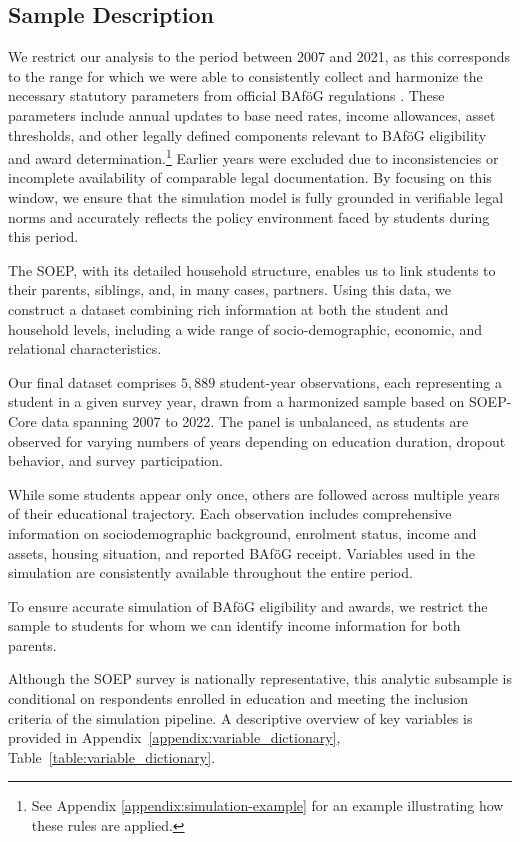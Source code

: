 \subsection{Sample Description}
We restrict our analysis to the period between 2007 and 2021, as this corresponds to the range for which we were able to consistently collect and harmonize the necessary statutory parameters from official BAföG regulations \citep{bafoeg_law}. These parameters include annual updates to base need rates, income allowances, asset thresholds, and other legally defined components relevant to BAföG eligibility and award determination.\footnote{
  See Appendix \ref{appendix:simulation-example} for an example illustrating how these rules are applied.
}
Earlier years were excluded due to inconsistencies or incomplete availability of comparable legal documentation. By focusing on this window, we ensure that the simulation model is fully grounded in verifiable legal norms and accurately reflects the policy environment faced by students during this period.

The SOEP, with its detailed household structure, enables us to link students to their parents, siblings, and, in many cases, partners. Using this data, we construct a dataset combining rich information at both the student and household levels, including a wide range of socio-demographic, economic, and relational characteristics.

Our final dataset comprises \(5{,}889\) student-year observations, each representing a student in a given survey year, drawn from a harmonized sample based on SOEP-Core data spanning 2007 to 2022. The panel is unbalanced, as students are observed for varying numbers of years depending on education duration, dropout behavior, and survey participation.

While some students appear only once, others are followed across multiple years of their educational trajectory. Each observation includes comprehensive information on sociodemographic background, enrolment status, income and assets, housing situation, and reported BAföG receipt. Variables used in the simulation are consistently available throughout the entire period.

To ensure accurate simulation of BAföG eligibility and awards, we restrict the sample to students for whom we can identify income information for both parents. 

Although the SOEP survey is nationally representative, this analytic subsample is conditional on respondents enrolled in education and meeting the inclusion criteria of the simulation pipeline. A descriptive overview of key variables is provided in Appendix~\ref{appendix:variable_dictionary}, Table~\ref{table:variable_dictionary}.



